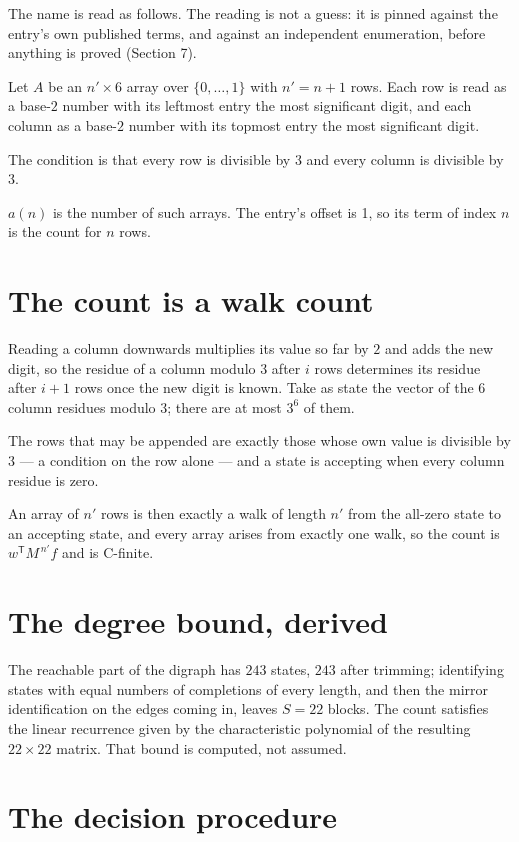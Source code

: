 \documentclass[11pt]{article}
\theoremstyle{definition}
\begin{document}
The name is read as follows. The reading is not a guess: it is pinned against the entry's own published terms, and against an independent enumeration, before anything is proved (Section 7).

Let $A$ be an $n' \times 6$ array over $\{0,\dots,1\}$ with $n' = n + 1$ rows. Each row is read as a base-$2$ number with its leftmost entry the most significant digit, and each column as a base-$2$ number with its topmost entry the most significant digit.

The condition is that every row is divisible by $3$ and every column is divisible by $3$.

$a(n)$ is the number of such arrays. The entry's offset is 1, so its term of index $n$ is the count for $n$ rows.

\section{The count is a walk count}

Reading a column downwards multiplies its value so far by $2$ and adds the new digit, so the residue of a column modulo $3$ after $i$ rows determines its residue after $i+1$ rows once the new digit is known. Take as state the vector of the $6$ column residues modulo $3$; there are at most $3^{6}$ of them.

The rows that may be appended are exactly those whose own value is divisible by $3$ --- a condition on the row alone --- and a state is accepting when every column residue is zero.

An array of $n'$ rows is then exactly a walk of length $n'$ from the all-zero state to an accepting state, and every array arises from exactly one walk, so the count is $w^{\mathsf T}M^{\,n'}f$ and is C-finite.

\section{The degree bound, derived}

The reachable part of the digraph has $243$ states, $243$ after trimming; identifying states with equal numbers of completions of every length, and then the mirror identification on the edges coming in, leaves $S = 22$ blocks. The count satisfies the linear recurrence given by the characteristic polynomial of the resulting $22\times22$ matrix. That bound is computed, not assumed.

\section{The decision procedure}
\end{document}
